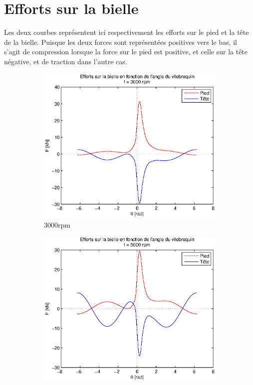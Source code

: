 \documentclass{article}
\begin{document}
\section{Efforts sur la bielle}

Les deux courbes représentent ici respectivement les efforts sur le pied et la tête de la bielle. Puisque les deux forces sont représentées positives vers le bas, il s'agit de compression lorsque la force sur le pied est positive, et celle sur la tête négative, et de traction dans l'autre cas. 

\begin{figure}[h]
\centering
    \begin{subfigure}[b]{0.45\textwidth}
    				\includegraphics[scale=0.51]{Schema/forces_3000rpm.eps}
                \caption{\unit{3000}{rpm}}
                \label{fig:forces_3000rpm}
    \end{subfigure}
    \begin{subfigure}[b]{0.45\textwidth}
        			\includegraphics[scale=0.51]{Schema/forces_5000rpm.eps}

\end{subfigure}
\end{figure}
\end{document}
